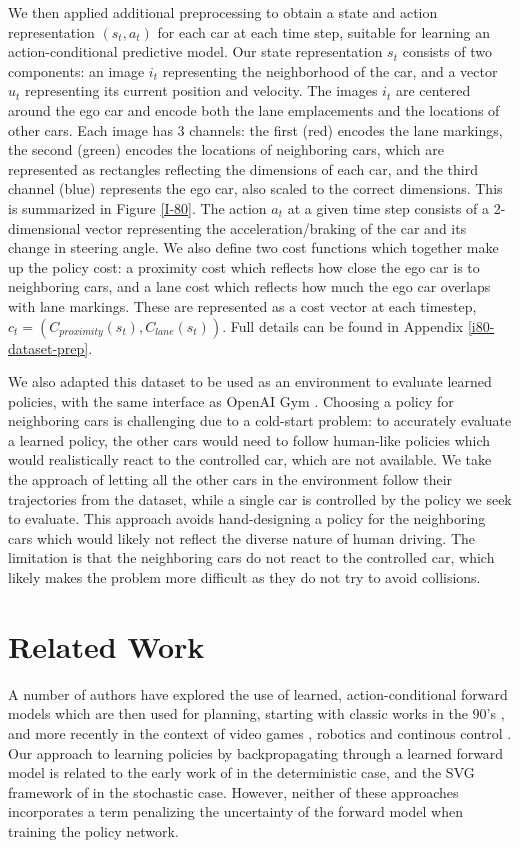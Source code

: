 \documentclass{article} %
\begin{document}
We then applied additional preprocessing to obtain a state and action representation $(s_t, a_t)$ for each car at each time step, suitable for learning an action-conditional predictive model.
Our state representation $s_t$ consists of two components: an image $i_t$ representing the neighborhood of the car, and a vector $u_t$ representing its current position and velocity.
The images $i_t$ are centered around the ego car and encode both the lane emplacements and the locations of other cars.
Each image has 3 channels: the first (red) encodes the lane markings, the second (green) encodes the locations of neighboring cars, which are represented as rectangles reflecting the dimensions of each car, and the third channel (blue) represents the ego car, also scaled to the correct dimensions.
This is summarized in Figure \ref{I-80}. The action $a_t$ at a given time step consists of a 2-dimensional vector representing the acceleration/braking of the car and its change in steering angle.
We also define two cost functions which together make up the policy cost: a proximity cost which reflects how close the ego car is to neighboring cars, and a lane cost which reflects how much the ego car overlaps with lane markings. These are represented as a cost vector at each timestep, $c_t = (C_{proximity}(s_t), C_{lane}(s_t))$. Full details can be found in Appendix \ref{i80-dataset-prep}.


We also adapted this dataset to be used as an environment to evaluate learned policies, with the same interface as OpenAI Gym \citep{OpenAIBaselines}.
Choosing a policy for neighboring cars is challenging due to a cold-start problem: to accurately evaluate a learned policy, the other cars would need to follow human-like policies which would realistically react to the controlled car, which are not available.
We take the approach of letting all the other cars in the environment follow their trajectories from the dataset, while a single car is controlled by the policy we seek to evaluate.
This approach avoids hand-designing a policy for the neighboring cars which would likely not reflect the diverse nature of human driving.
The limitation is that the neighboring cars do not react to the controlled car, which likely makes the problem more difficult as they do not try to avoid collisions.


\section{Related Work}

A number of authors have explored the use of learned, action-conditional forward models which are then used for planning, starting with classic works in the 90's \citep{Nguyen1990, Schmidhuber1990, Jordan1992}, and more recently in the context of video games \citep{Oh15, Pascanu17, I2A}, robotics and continous control \citep{FinnGL16, Poke, Nagabandi2017, UPN}.
Our approach to learning policies by backpropagating through a learned forward model is related to the early work of \citep{Nguyen1989} in the deterministic case, and the SVG framework of \citep{SVG} in the stochastic case. However, neither of these approaches incorporates a term penalizing the uncertainty of the forward model when training the policy network.
\end{document}
